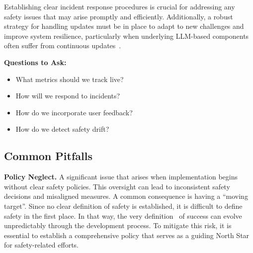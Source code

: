 Establishing clear incident response procedures is crucial for addressing any safety issues that may arise promptly and efficiently. Additionally, a robust strategy for handling updates must be in place to adapt to new challenges and improve system resilience, particularly when underlying LLM-based components often suffer from continuous updates~.

\textbf{Questions to Ask:}
\begin{itemize}
    \item What metrics should we track live?
    \item How will we respond to incidents?
    \item How do we incorporate user feedback?
    \item How do we detect safety drift?
\end{itemize}

\subsection{Common Pitfalls}

\textbf{Policy Neglect.} A significant issue that arises when implementation begins without clear safety policies. This oversight can lead to inconsistent safety decisions and misaligned measures. A common consequence is having a ``moving target''. Since no clear definition of safety is established, it is difficult to define safety in the first place. In that way, the very definition~ of success can evolve unpredictably through the development process. To mitigate this risk, it is essential to establish a comprehensive policy that serves as a guiding North Star for safety-related efforts.

